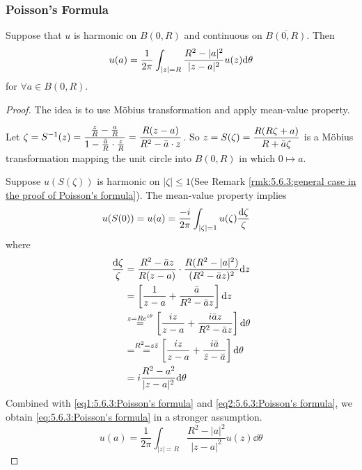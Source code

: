 \subsubsection{Poisson's Formula}
\begin{theorem}\label{thm:5.6.3:Poisson's formula}
    Suppose that  $ u  $ is harmonic on  $ B(0,R ) $ and continuous on  $ \overline{B(0,R)} $. Then 
    \begin{equation}
        u(a)=\frac{1 }{2\pi }\int_{|z|=R}\displaystyle\frac{R^2-|a|^2}{|z-a|^2}u(z)\mathrm{d} \theta\label{eq:5.6.3:Poisson's formula}
    \end{equation}
    for  $\forall  a\in B(0,R) $. 
\end{theorem}
\begin{proof}
    The idea is to use M{\"o}bius transformation and apply mean-value property.

    Let  $ \zeta=S^{-1}(z)=\displaystyle\frac{\frac{z}{R}-\frac{a}{R}}{1-\frac{\bar{a}}{R}\cdot \frac{z}{R}}=\frac{R(z-a)}{R^2-\bar{a}\cdot z} $. So  $ \displaystyle z=S(\zeta)=\frac{R(R\zeta+a)}{R+\bar{a}\zeta} $ is a M{\"o}bius transformation mapping the unit circle into  $ B(0,R) $ in which $ 0\mapsto a $.
    
    Suppose  $ u(S(\zeta)) $ is harmonic on  $ |\zeta| \leq 1 $(See Remark \ref{rmk:5.6.3:general case in the proof of Poisson's formula}). The mean-value property implies 
    \begin{equation}\label{eq1:5.6.3:Poisson's formula}
        \begin{aligned}
            u(S(0))=u(a)&=\displaystyle\frac{-i}{2\pi}\int_{|\zeta|=1}u(\zeta)\frac{\mathrm{d}\zeta}{\zeta}
        \end{aligned}
    \end{equation} 
    where
    \begin{equation}\label{eq2:5.6.3:Poisson's formula}
        \begin{aligned}
            \frac{\mathrm{d} \zeta}{\zeta}&=\frac{R^2-\bar{a}z}{R(z-a)}\cdot\frac{R(R^2-|a|^2)}{(R^2-\bar{a}z)^2}\mathrm{d} z\\
            &=\left[\frac{1}{z-a}+\frac{\bar{a}}{R^2-\bar{a}z}\right]\mathrm{d} z\\
            &\overset{z=Re^{i\theta}}{=}\left[\displaystyle\frac{iz}{z-a}+\frac{i\bar{a}z}{R^2-\bar{a}z}\right]\mathrm{d} \theta\\
            &=\overset{R^2=z\bar{z}}{=}\left[\displaystyle\frac{iz}{z-a}+\frac{i\bar{a}}{\bar{z}-\bar{a}}\right]\mathrm{d}\theta\\
            &=i\frac{R^2-a^2}{|z-a|^2}\mathrm{d}\theta
        \end{aligned}
    \end{equation}
    Combined with \eqref{eq1:5.6.3:Poisson's formula} and \eqref{eq2:5.6.3:Poisson's formula}, we obtain \eqref{eq:5.6.3:Poisson's formula} in a stronger assumption. 
    \[u(a)=\frac{1}{2\pi}\int_{|z|=R}\frac{R^2-|a|^2}{|z-a|^2}u(z)\dd \theta\]
\end{proof}

